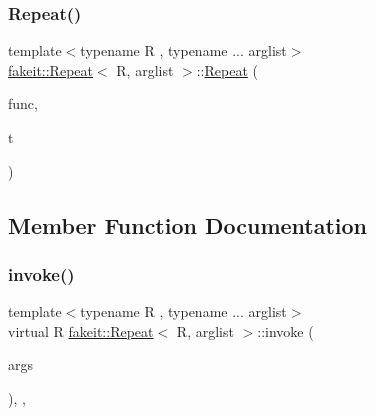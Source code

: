 \subsubsection{\texorpdfstring{Repeat()}{Repeat()}\hspace{0.1cm}{\footnotesize\ttfamily [18/18]}}
{\footnotesize\ttfamily template$<$typename R , typename ... arglist$>$ \\
\mbox{\hyperlink{structfakeit_1_1Repeat}{fakeit\+::\+Repeat}}$<$ R, arglist $>$\+::\mbox{\hyperlink{structfakeit_1_1Repeat}{Repeat}} (\begin{DoxyParamCaption}\item[{std\+::function$<$ R(typename \mbox{\hyperlink{structfakeit_1_1test__arg}{fakeit\+::test\+\_\+arg}}$<$ arglist $>$\+::type...)$>$}]{func,  }\item[{long}]{t }\end{DoxyParamCaption})\hspace{0.3cm}{\ttfamily [inline]}}



\subsection{Member Function Documentation}
\mbox{\label{structfakeit_1_1Repeat_a64e8c3a413edce162acaec724e832e19}} 
\subsubsection{\texorpdfstring{invoke()}{invoke()}\hspace{0.1cm}{\footnotesize\ttfamily [1/9]}}
{\footnotesize\ttfamily template$<$typename R , typename ... arglist$>$ \\
virtual R \mbox{\hyperlink{structfakeit_1_1Repeat}{fakeit\+::\+Repeat}}$<$ R, arglist $>$\+::invoke (\begin{DoxyParamCaption}\item[{const \mbox{\hyperlink{namespacefakeit_a476a37a598825e1b5dd67b3a176491a1}{Arguments\+Tuple}}$<$ arglist... $>$ \&}]{args }\end{DoxyParamCaption})\hspace{0.3cm}{\ttfamily [inline]}, {\ttfamily [override]}, {\ttfamily [virtual]}}



